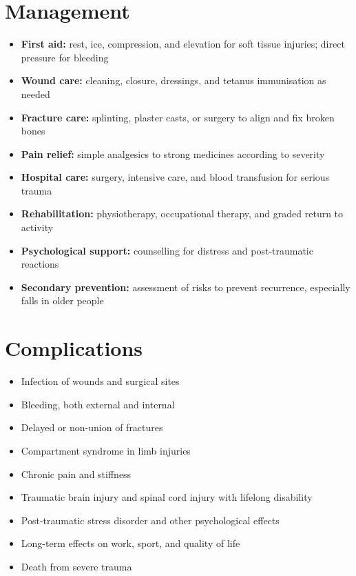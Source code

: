 \section*{Management}
\begin{itemize}
    \item \textbf{First aid:} rest, ice, compression, and elevation for soft tissue injuries; direct pressure for bleeding
    \item \textbf{Wound care:} cleaning, closure, dressings, and tetanus immunisation as needed
    \item \textbf{Fracture care:} splinting, plaster casts, or surgery to align and fix broken bones
    \item \textbf{Pain relief:} simple analgesics to strong medicines according to severity
    \item \textbf{Hospital care:} surgery, intensive care, and blood transfusion for serious trauma
    \item \textbf{Rehabilitation:} physiotherapy, occupational therapy, and graded return to activity
    \item \textbf{Psychological support:} counselling for distress and post-traumatic reactions
    \item \textbf{Secondary prevention:} assessment of risks to prevent recurrence, especially falls in older people
\end{itemize}

\section*{Complications}
\begin{itemize}
    \item Infection of wounds and surgical sites
    \item Bleeding, both external and internal
    \item Delayed or non-union of fractures
    \item Compartment syndrome in limb injuries
    \item Chronic pain and stiffness
    \item Traumatic brain injury and spinal cord injury with lifelong disability
    \item Post-traumatic stress disorder and other psychological effects
    \item Long-term effects on work, sport, and quality of life
    \item Death from severe trauma
\end{itemize}

